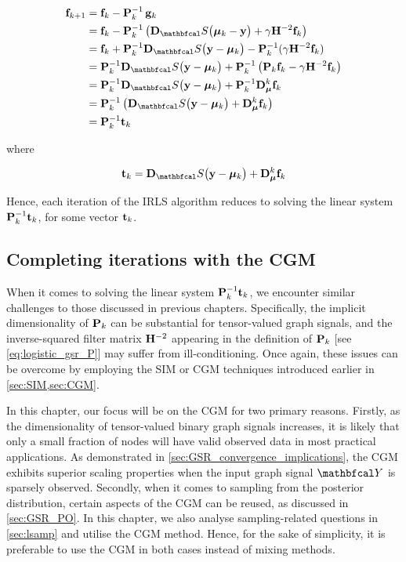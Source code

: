 \begin{align*}
    \f_{k+1} &= \f_k - \PP^{-1}_k \, \g_k\\
    &= \f_{k} - \PP^{-1}_k \left(\D_\St \big(\muu_k - \y\big) + \gamma \HH^{-2} \f_k\right) \\
    &= \f_k + \PP^{-1}_k \D_\St \big(\y - \muu_k\big) - \PP^{-1}_k (\gamma \HH^{-2} \f_k) \\
    &= \PP^{-1}_k \D_\St \big(\y - \muu_k \big) + \PP^{-1}_k \left(\PP_k \f_k - \gamma \HH^{-2} \f_k\right) \\
    &= \PP^{-1}_k \D_\St \big(\y - \muu_k \big) + \PP^{-1}_k \D_{\muu}^k\f_k  \\
    &= \PP^{-1}_k \left(\D_\St \big(\y - \muu_k \big) + \D_{\muu}^k\f_k \right) \\
    &= \PP^{-1}_k \tee_k
\end{align*}

where

\begin{equation}
    \tee_k = \D_\St \big(\y - \muu_k\big) + \D_{\muu}^k \f_k
\end{equation}

Hence, each iteration of the IRLS algorithm reduces to solving the linear system $\mathbf{P}^{-1}_k \mathbf{t}_k$, for some vector $\mathbf{t}_k$. 

\subsection{Completing iterations with the CGM}

When it comes to solving the linear system $\mathbf{P}^{-1}_k \mathbf{t}_k$, we encounter similar challenges to those discussed in previous chapters. Specifically, the implicit dimensionality of $\mathbf{P}_k$ can be substantial for tensor-valued graph signals, and the inverse-squared filter matrix $\mathbf{H}^{-2}$ appearing in the definition of $\mathbf{P}_k$ [see \cref{eq:logistic_gsr_P}] may suffer from ill-conditioning. Once again, these issues can be overcome by employing the SIM or CGM techniques introduced earlier in \cref{sec:SIM,sec:CGM}.


In this chapter, our focus will be on the CGM for two primary reasons. Firstly, as the dimensionality of tensor-valued binary graph signals increases, it is likely that only a small fraction of nodes will have valid observed data in most practical applications. As demonstrated in \cref{sec:GSR_convergence_implications}, the CGM exhibits superior scaling properties when the input graph signal $\Yt$ is sparsely observed. Secondly, when it comes to sampling from the posterior distribution, certain aspects of the CGM can be reused, as discussed in \cref{sec:GSR_PO}. In this chapter, we also analyse sampling-related questions in \cref{sec:lsamp} and utilise the CGM method. Hence, for the sake of simplicity, it is preferable to use the CGM in both cases instead of mixing methods.

